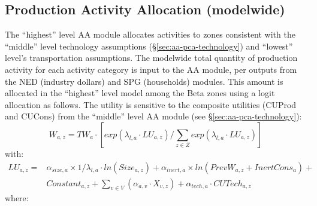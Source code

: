\subsection{Production Activity Allocation (modelwide)}\label{sec:aa-pa-allocation-modelwide}
The ``highest'' level AA module allocates activities to zones consistent with the ``middle'' level technology assumptions (\S\ref{sec:aa-pca-technology}) and ``lowest'' level's transportation assumptions. The modelwide total quantity of production activity for each activity category is input to the AA module, per outputs from the NED (industry dollars) and SPG (households) modules. This amount is allocated in the ``highest'' level model among the Beta zones using a logit allocation as follows. The utility is sensitive to the composite utilities (CUProd and CUCons) from the ``middle'' level AA module (see \S\ref{sec:aa-pca-technology}):
\begin{equation}\label{eq:6.01}
W_{a,z} = TW_a \cdot \left[ exp(\lambda_{l,a} \cdot LU_{a,z}) / \sum_{z \in Z} exp(\lambda_{l,a} \cdot LU_{a,z}) \right]
\end{equation}
\noindent with:
\begin{equation}\label{eq:6.02}
\begin{aligned}
LU_{a,z} = {} & \alpha_{size,a} \times 1/\lambda_{l,a} \cdot ln(Size_{a,z}) + \alpha_{inert,a} \times ln(PrevW_{a,z} + InertCons_a) + \\
& Constant_{a,z} + \sum_{v \in V} (\alpha_{a,v} \cdot X_{v,z}) + \alpha_{tech,a} \cdot CUTech_{a,z}
\end{aligned}
\end{equation}
\noindent where:
